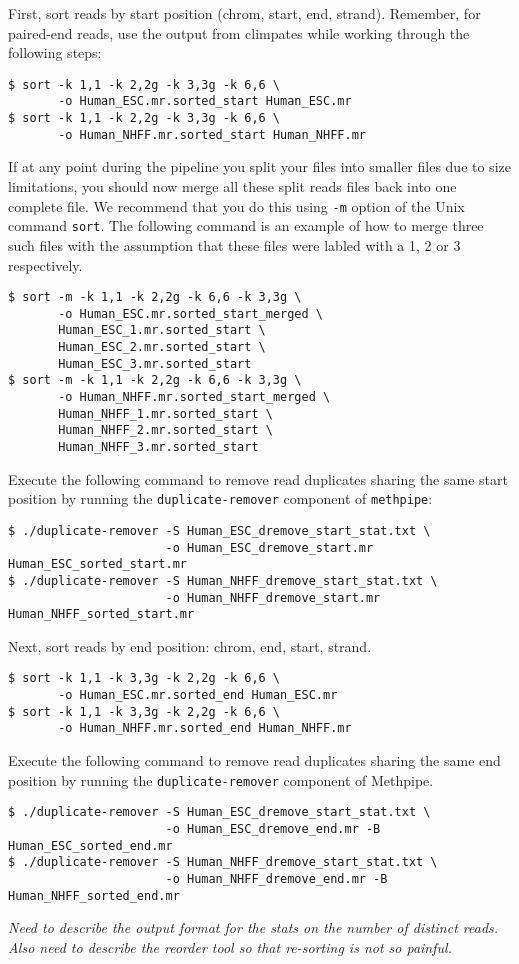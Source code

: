 \documentclass[10pt]{article}
\newcommand{\meth}{\texttt{methpipe}}
\newcommand{\prog}[1]{\texttt{#1}}
\newcommand{\op}[1]{\texttt{#1}}
\begin{document}
\begin{sloppypar}
First, sort reads by start position (chrom, start, end,
strand). Remember, for paired-end reads, use the output from climpates
while working through the following steps:
\begin{verbatim}
$ sort -k 1,1 -k 2,2g -k 3,3g -k 6,6 \
       -o Human_ESC.mr.sorted_start Human_ESC.mr
$ sort -k 1,1 -k 2,2g -k 3,3g -k 6,6 \
       -o Human_NHFF.mr.sorted_start Human_NHFF.mr
\end{verbatim}
If at any point during the pipeline you split your files into smaller
files due to size limitations, you should now merge all these split
reads files back into one complete file. We recommend that you do this
using \op{-m} option of the Unix command \prog{sort}. The following
command is an example of how to merge three such files with the
assumption that these files were labled with a 1, 2 or 3 respectively.
\begin{verbatim}
$ sort -m -k 1,1 -k 2,2g -k 6,6 -k 3,3g \
       -o Human_ESC.mr.sorted_start_merged \
       Human_ESC_1.mr.sorted_start \
       Human_ESC_2.mr.sorted_start \
       Human_ESC_3.mr.sorted_start
$ sort -m -k 1,1 -k 2,2g -k 6,6 -k 3,3g \
       -o Human_NHFF.mr.sorted_start_merged \
       Human_NHFF_1.mr.sorted_start \
       Human_NHFF_2.mr.sorted_start \
       Human_NHFF_3.mr.sorted_start
\end{verbatim}
Execute the following command to remove read duplicates sharing the
same start position by running the  \prog{duplicate-remover} component
of \meth{}:
\begin{verbatim}
$ ./duplicate-remover -S Human_ESC_dremove_start_stat.txt \
                      -o Human_ESC_dremove_start.mr Human_ESC_sorted_start.mr
$ ./duplicate-remover -S Human_NHFF_dremove_start_stat.txt \
                      -o Human_NHFF_dremove_start.mr Human_NHFF_sorted_start.mr
\end{verbatim}
Next, sort reads by end position: chrom, end, start, strand.
\begin{verbatim}
$ sort -k 1,1 -k 3,3g -k 2,2g -k 6,6 \
       -o Human_ESC.mr.sorted_end Human_ESC.mr
$ sort -k 1,1 -k 3,3g -k 2,2g -k 6,6 \
       -o Human_NHFF.mr.sorted_end Human_NHFF.mr
\end{verbatim}
Execute the following command to remove read duplicates sharing the
same end position by running the \prog{duplicate-remover} component of
Methpipe.
\begin{verbatim}
$ ./duplicate-remover -S Human_ESC_dremove_start_stat.txt \
                      -o Human_ESC_dremove_end.mr -B Human_ESC_sorted_end.mr
$ ./duplicate-remover -S Human_NHFF_dremove_start_stat.txt \
                      -o Human_NHFF_dremove_end.mr -B Human_NHFF_sorted_end.mr
\end{verbatim}
\end{sloppypar}
\noindent
{\em Need to describe the output format for the stats on the number of
  distinct reads. Also need to describe the reorder tool so that
  re-sorting is not so painful.}
\end{document}
